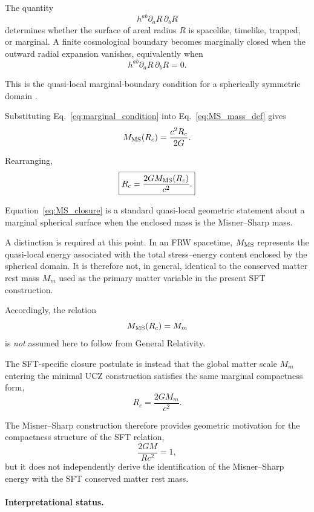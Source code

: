 \documentclass[12pt]{article}
\begin{document}
The quantity
\[
h^{ab}\partial_aR\,\partial_bR
\]
determines whether the surface of areal radius \(R\) is spacelike,
timelike, trapped, or marginal. A finite cosmological boundary becomes
marginally closed when the outward radial expansion vanishes,
equivalently when
\begin{equation}
h^{ab}\partial_aR\,\partial_bR=0.
\label{eq:marginal_condition}
\end{equation}

This is the quasi-local marginal-boundary condition for a spherically
symmetric domain \cite{Hayward1996,Faraoni2015}.

Substituting Eq.~\eqref{eq:marginal_condition} into
Eq.~\eqref{eq:MS_mass_def} gives
\begin{equation}
M_{\rm MS}(R_c)
=
\frac{c^2R_c}{2G}.
\end{equation}

Rearranging,
\begin{equation}
\boxed{
R_c=\frac{2GM_{\rm MS}(R_c)}{c^2}.
}
\label{eq:MS_closure}
\end{equation}

Equation~\eqref{eq:MS_closure} is a standard quasi-local geometric
statement about a marginal spherical surface when the enclosed mass is
the Misner--Sharp mass.

A distinction is required at this point. In an FRW spacetime,
$M_{\rm MS}$ represents the quasi-local energy associated with the
total stress--energy content enclosed by the spherical domain. It is
therefore not, in general, identical to the conserved matter rest mass
$M_m$ used as the primary matter variable in the present SFT
construction.

Accordingly, the relation
\[
M_{\rm MS}(R_c)=M_m
\]
is \emph{not} assumed here to follow from General Relativity.

The SFT-specific closure postulate is instead that the global matter
scale $M_m$ entering the minimal UCZ construction satisfies the same
marginal compactness form,
\begin{equation}
\boxed{
R_c=\frac{2GM_m}{c^2}.
}
\label{eq:UCZ_global_derivation}
\end{equation}

The Misner--Sharp construction therefore provides geometric motivation
for the compactness structure of the SFT relation,
\[
\frac{2GM}{Rc^2}=1,
\]
but it does not independently derive the identification of the
Misner--Sharp energy with the SFT conserved matter rest mass.

\paragraph{Interpretational status.}
\end{document}

